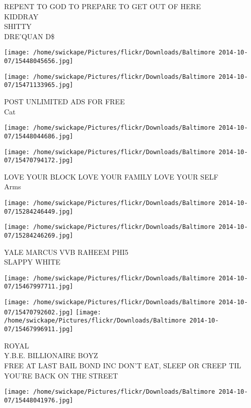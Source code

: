 \documentclass[10pt,letterpaper]{article}
\begin{document}
REPENT TO GOD TO PREPARE TO GET OUT OF HERE\\
KIDDRAY\\
SHITTY\\
DRE'QUAN D\$
\pagebreak

\texttt{[image: /home/swickape/Pictures/flickr/Downloads/Baltimore 2014-10-07/15448045656.jpg]}

\vspace{0.25in}
\texttt{[image: /home/swickape/Pictures/flickr/Downloads/Baltimore 2014-10-07/15471133965.jpg]}

POST UNLIMITED ADS FOR FREE\\
Cat
\pagebreak

\texttt{[image: /home/swickape/Pictures/flickr/Downloads/Baltimore 2014-10-07/15448044686.jpg]}

\vspace{0.25in}
\texttt{[image: /home/swickape/Pictures/flickr/Downloads/Baltimore 2014-10-07/15470794172.jpg]}

LOVE YOUR BLOCK LOVE YOUR FAMILY LOVE YOUR SELF\\
Arms
\pagebreak

\texttt{[image: /home/swickape/Pictures/flickr/Downloads/Baltimore 2014-10-07/15284246449.jpg]}

\vspace{0.25in}
\texttt{[image: /home/swickape/Pictures/flickr/Downloads/Baltimore 2014-10-07/15284246269.jpg]}

YALE MARCUS VVB RAHEEM PHI5\\
SLAPPY WHITE
\pagebreak

\texttt{[image: /home/swickape/Pictures/flickr/Downloads/Baltimore 2014-10-07/15467997711.jpg]}

\vspace{0.25in}
\texttt{[image: /home/swickape/Pictures/flickr/Downloads/Baltimore 2014-10-07/15470792602.jpg]}
\texttt{[image: /home/swickape/Pictures/flickr/Downloads/Baltimore 2014-10-07/15467996911.jpg]}

ROYAL\\
Y.B.E. BILLIONAIRE BOYZ\\
FREE AT LAST BAIL BOND INC DON'T EAT, SLEEP OR CREEP TIL YOU'RE BACK ON THE STREET
\pagebreak

\texttt{[image: /home/swickape/Pictures/flickr/Downloads/Baltimore 2014-10-07/15448041976.jpg]}
\end{document}
